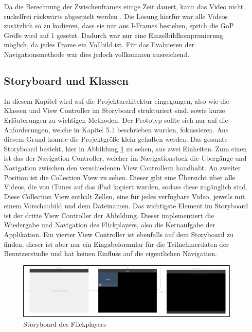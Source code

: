\documentclass[11pt,a4paper]{report}
\begin{document}
Da die Berechnung der Zwischenframes einige Zeit dauert, kann das Video nicht ruckelfrei rückwärts abgespielt werden \cite{le1991mpeg}. Die Lösung hierfür war alle Videos zusätzlich so zu kodieren, dass sie nur aus I-Frames bestehen, sprich die GoP Größe wird auf 1 gesetzt. Dadurch war nur eine Einzelbildkomprimierung möglich, da jedes Frame ein Vollbild ist. Für das Evaluieren der Navigationsmethode war dies jedoch vollkommen ausreichend.

\subsection{Storyboard und Klassen}

In diesem Kapitel wird auf die Projektarchitektur eingegangen, also wie die Klassen und View Controller im Storyboard strukturiert sind, sowie kurze Erläuterungen zu wichtigen Methoden. Der Prototyp sollte sich nur auf die Anforderungen, welche in Kapitel 5.1 beschrieben wurden, fokussieren. Aus diesem Grund konnte die Projektgröße klein gehalten werden. Das gesamte Storyboard besteht, hier in Abbildung \ref{storyboard_flickplayer} zu sehen, aus zwei Einheiten. Zum einen ist das der Navigation Controller, welcher im Navigationstack die Übergänge und Navigation zwischen den verschiedenen View Controllern handhabt. An zweiter Position ist die Collection View zu sehen. Dieser gibt eine Übersicht über alle Videos, die von iTunes auf das iPad kopiert wurden, sodass diese zugänglich sind. Diese Collection View enthält Zellen, eine für jedes verfügbare Video, jeweils mit einem Vorschaubild und dem Dateinamen. Das wichtigste Element im Storyboard ist der dritte View Controller der Abbildung. Dieser implementiert die Wiedergabe und Navigation des Flickplayers, also die Kernaufgabe der Applikation. Ein vierter View Controller ist ebenfalls auf dem Storyboard zu finden, dieser ist aber nur ein Eingabeformular für die Teilnehmerdaten der Benutzerstudie und hat keinen Einfluss auf die eigentlichen Navigation.
\begin{figure}[h]
\begin{center}
\includegraphics[scale=0.9]{./images/26.png}
\caption{Storyboard des Flickplayers}
\label{storyboard_flickplayer}
\end{center}
\end{figure}
\end{document}
